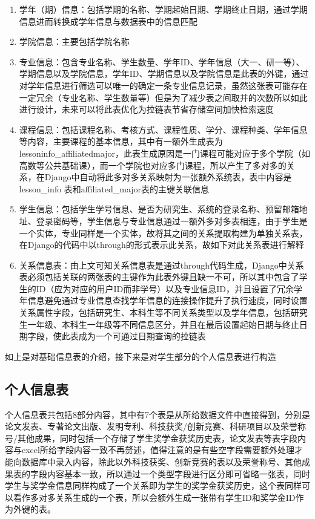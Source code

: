 \begin{enumerate}
  \item 学年（期）信息：包括学期的名称、学期起始日期、学期终止日期，通过学期信息进而转换成学年信息与数据表中的信息匹配
  \item 学院信息：主要包括学院名称
  \item 专业信息：包含专业名称、学生数量、学年ID、学年信息（大一、研一等）、学期信息以及学院信息，学年ID、学期信息以及学院信息是此表的外键，通过对学年信息进行筛选可以唯一的确定一条专业信息记录，虽然这张表可能存在一定冗余（专业名称、学生数量等）但是为了减少表之间取并的次数所以如此进行设计，未来可以将此表优化为拉链表节省存储空间加快检索速度
  \item 课程信息：包括课程名称、考核方式、课程性质、学分、课程种类、学年信息等内容，主要课程的基本信息，其中有一额外生成表为lessoninfo\_affiliatedmajor，此表生成原因是一门课程可能对应于多个学院（如高数等公共基础课），而一个学院也对应多门课程，所以产生了多对多的关系，在Django中自动将此多对多关系映射为一张额外系统表，表中内容是lesson\_info 表和affiliated\_major表的主键关联信息
  \item 学生信息：包括学生学号信息、是否为研究生、系统的登录名称、预留邮箱地址、登录密码等，学生信息与专业信息通过一额外多对多表相连，由于学生是一个实体，专业同样是一个实体，故将其之间的关系提取构建为单独关系表，在Django的代码中以through的形式表示此关系，故如下对此关系表进行解释
  \item 关系信息表：由上文可知关系信息表是通过through代码生成，Django中关系表必须包括关联的两张表的主键作为此表外键且缺一不可，所以其中包含了学生的ID（应为对应的用户ID而非学号）以及专业信息ID，并且设置了冗余学年信息避免通过专业信息查找学年信息的连接操作提升了执行速度，同时设置关系属性字段，包括研究生、本科生等不同关系类型以及学年信息，包括研究生一年级、本科生一年级等不同信息区分，并且在最后设置起始日期与终止日期字段，使此表成为一个可通过日期查询的拉链表
\end{enumerate}

如上是对基础信息表的介绍，接下来是对学生部分的个人信息表进行构造

\subsection{个人信息表}

个人信息表共包括8部分内容，其中有7个表是从所给数据文件中直接得到，分别是论文发表、专著论文出版、发明专利、科技获奖/创新竞赛、科研项目以及荣誉称号/其他成果，同时包括一个存储了学生奖学金获奖历史表，论文发表等表字段内容与excel所给字段内容一致不再赘述，值得注意的是有些空字段需要额外处理才能向数据库中录入内容，除此以外科技获奖、创新竞赛的表以及荣誉称号、其他成果表的字段内容基本一致，所以通过一个类型字段进行区分即可省略一张表，同时学生与奖学金信息同样构成了一个关系即为学生的奖学金获奖历史，这个表同样可以看作多对多关系生成的一个表，所以会额外生成一张带有学生ID和奖学金ID作为外键的表。

